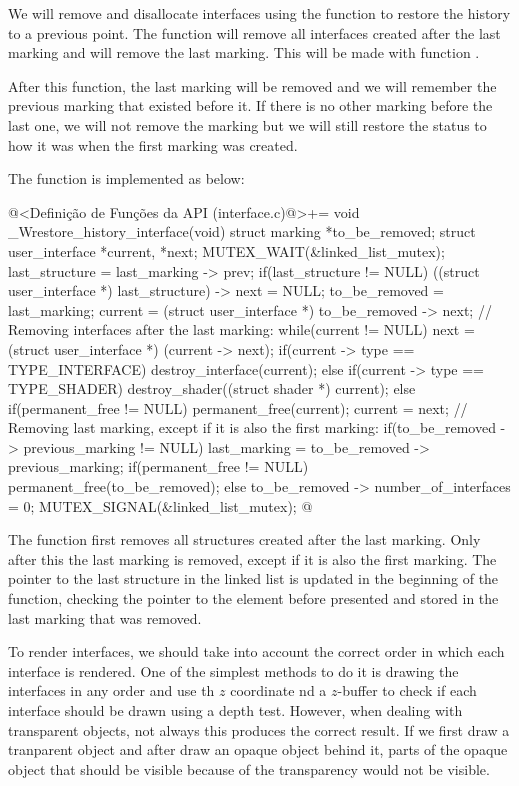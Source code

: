 
We will remove and disallocate interfaces using the function to
restore the history to a previous point. The function will remove all
interfaces created after the last marking and will remove the last
marking. This will be made with
function .

After this function, the last marking will be removed and we will
remember the previous marking that existed before it. If there is no
other marking before the last one, we will not remove the marking but
we will still restore the status to how it was when the first marking
was created.

The function is implemented as below:

\iniciocodigo
@<Definição de Funções da API (interface.c)@>+=
void _Wrestore_history_interface(void){
  struct marking *to_be_removed;
  struct user_interface *current, *next;
  MUTEX_WAIT(&linked_list_mutex);
  last_structure = last_marking -> prev;
  if(last_structure != NULL)
    ((struct user_interface *) last_structure) -> next = NULL;
  to_be_removed = last_marking;
  current = (struct user_interface *) to_be_removed -> next;
  // Removing interfaces after the last marking:
  while(current != NULL){
    next = (struct user_interface *) (current -> next);
    if(current -> type == TYPE_INTERFACE)
      destroy_interface(current);
    else if(current -> type == TYPE_SHADER)
      destroy_shader((struct shader *) current);
    else if(permanent_free != NULL)
      permanent_free(current);
    current = next;
  }
  // Removing last marking, except if it is also the first marking:
  if(to_be_removed -> previous_marking != NULL){
    last_marking = to_be_removed -> previous_marking;
    if(permanent_free != NULL)
      permanent_free(to_be_removed);
  }
  else
    to_be_removed -> number_of_interfaces = 0;
  MUTEX_SIGNAL(&linked_list_mutex);
}
@
\fimcodigo

The function first removes all structures created after the last
marking. Only after this the last marking is removed, except if it is
also the first marking. The pointer to the last structure in the
linked list is updated in the beginning of the function, checking the
pointer to the element before presented and stored in the last
marking that was removed.


To render interfaces, we should take into account the correct order in
which each interface is rendered. One of the simplest methods to do it
is drawing the interfaces in any order and use th $z$ coordinate nd a
$z$-buffer to check if each interface should be drawn using a depth
test. However, when dealing with transparent objects, not always this
produces the correct result. If we first draw a tranparent object and
after draw an opaque object behind it, parts of the opaque object that
should be visible because of the transparency would not be visible.

